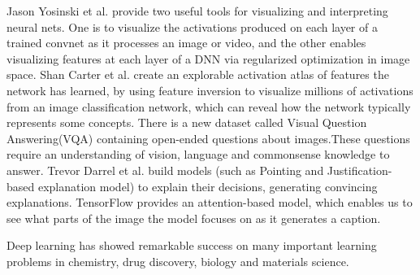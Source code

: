 \documentclass[10pt,twocolumn,letterpaper]{article}
\begin{document}
Jason Yosinski et al. provide two useful tools for visualizing and interpreting neural nets. One is to visualize  the activations produced on each layer of a trained convnet as it processes an image or video, and the other enables visualizing features at each layer of a DNN via regularized optimization in image space.
Shan Carter et al. create an explorable activation atlas of features the network has learned, by using feature inversion to visualize millions of activations from an image classification network, which can reveal how the network typically represents some concepts.
There is a new dataset called Visual Question Answering(VQA) containing open-ended questions about images.These questions require an understanding of vision, language and commonsense knowledge to answer.
Trevor Darrel et al. build  models (such as Pointing and Justification-based explanation model) to explain their decisions, generating convincing explanations.
TensorFlow provides an attention-based model, which enables us to see what parts of the image the model focuses on as it generates a caption.

Deep learning has showed remarkable success on many important learning problems in chemistry, drug discovery, biology and materials science.
\end{document}
